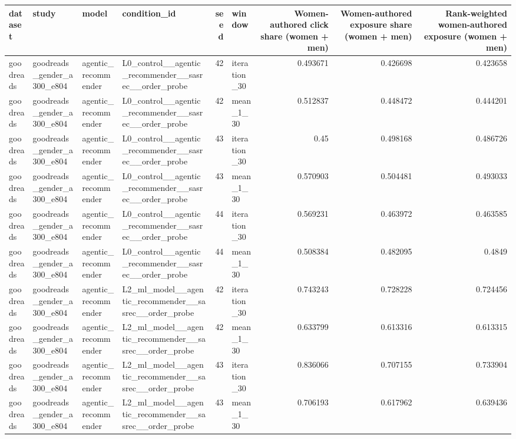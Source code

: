 \begin{table}[htbp!]
\centering
\small
\setlength{\tabcolsep}{3pt}
\renewcommand{\arraystretch}{1.1}
\begin{tabular}{llllrlrrr}
\hline
dataset & study & model & condition\_id & seed & window & Women-authored click share (women + men) & Women-authored exposure share (women + men) & Rank-weighted women-authored exposure (women + men) \\
\hline
goodreads & goodreads\_gender\_a300\_e804 & agentic\_recommender & L0\_control\_\_agentic\_recommender\_\_sasrec\_\_order\_probe & 42 & iteration\_30 & 0.493671 & 0.426698 & 0.423658 \\
goodreads & goodreads\_gender\_a300\_e804 & agentic\_recommender & L0\_control\_\_agentic\_recommender\_\_sasrec\_\_order\_probe & 42 & mean\_1\_30 & 0.512837 & 0.448472 & 0.444201 \\
goodreads & goodreads\_gender\_a300\_e804 & agentic\_recommender & L0\_control\_\_agentic\_recommender\_\_sasrec\_\_order\_probe & 43 & iteration\_30 & 0.45 & 0.498168 & 0.486726 \\
goodreads & goodreads\_gender\_a300\_e804 & agentic\_recommender & L0\_control\_\_agentic\_recommender\_\_sasrec\_\_order\_probe & 43 & mean\_1\_30 & 0.570903 & 0.504481 & 0.493033 \\
goodreads & goodreads\_gender\_a300\_e804 & agentic\_recommender & L0\_control\_\_agentic\_recommender\_\_sasrec\_\_order\_probe & 44 & iteration\_30 & 0.569231 & 0.463972 & 0.463585 \\
goodreads & goodreads\_gender\_a300\_e804 & agentic\_recommender & L0\_control\_\_agentic\_recommender\_\_sasrec\_\_order\_probe & 44 & mean\_1\_30 & 0.508384 & 0.482095 & 0.4849 \\
goodreads & goodreads\_gender\_a300\_e804 & agentic\_recommender & L2\_ml\_model\_\_agentic\_recommender\_\_sasrec\_\_order\_probe & 42 & iteration\_30 & 0.743243 & 0.728228 & 0.724456 \\
goodreads & goodreads\_gender\_a300\_e804 & agentic\_recommender & L2\_ml\_model\_\_agentic\_recommender\_\_sasrec\_\_order\_probe & 42 & mean\_1\_30 & 0.633799 & 0.613316 & 0.613315 \\
goodreads & goodreads\_gender\_a300\_e804 & agentic\_recommender & L2\_ml\_model\_\_agentic\_recommender\_\_sasrec\_\_order\_probe & 43 & iteration\_30 & 0.836066 & 0.707155 & 0.733904 \\
goodreads & goodreads\_gender\_a300\_e804 & agentic\_recommender & L2\_ml\_model\_\_agentic\_recommender\_\_sasrec\_\_order\_probe & 43 & mean\_1\_30 & 0.706193 & 0.617962 & 0.639436 \\

\end{tabular}
\end{table}
